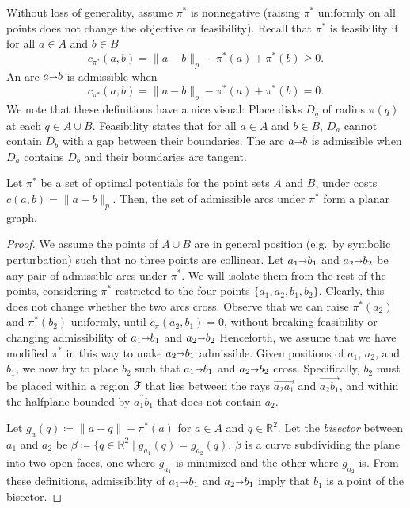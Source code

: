 \documentclass[a4paper,UKenglish]{socg-lipics-v2018}
\def\reals{\mathbb{R}}
\def\norm#1{\mathopen\| #1 \mathclose\|}	%
\def\arcto{\mathord\shortrightarrow}
\def\arc#1#2{#1\arcto#2}
\theoremstyle{plain}
\numberwithin{figure}{section}
\def\EMPH#1{\textcolor{BrickRed}{{\emph{#1}}}}
\begin{document}
\begin{toappendix}
Without loss of generality, assume $\pi^*$ is nonnegative (raising $\pi^*$
uniformly on all points does not change the objective or feasibility).
Recall that $\pi^*$ is feasibility if for all $a \in A$ and $b \in B$
\[
	c_{\pi^*}(a, b) = \norm{a-b}_p - \pi^*(a) + \pi^*(b) \geq 0.
\]
An arc $\arc ab$ is admissible when
\[
	c_{\pi^*}(a, b) = \norm{a-b}_p - \pi^*(a) + \pi^*(b) = 0.
\]
We note that these definitions have a nice visual:
Place disks $D_q$ of radius $\pi(q)$ at each $q \in A \cup B$.
Feasibility states that for all $a \in A$ and $b \in B$, $D_a$ cannot contain
$D_b$ with a gap between their boundaries.
The arc $\arc ab$ is admissible when $D_a$ contains $D_b$ and their boundaries
are tangent.

\begin{lemmarep}
\label{lemma:admiss_planar}
Let $\pi^*$ be a set of optimal potentials for the point sets $A$ and $B$,
under costs $c(a, b) = \norm{a-b}_p$.
Then, the set of admissible arcs under $\pi^*$ form a planar graph.
\end{lemmarep}

\begin{proof}
We assume the points of $A \cup B$ are in general position (e.g.\ by symbolic
perturbation) such that no three points are collinear.
Let $\arc{a_1}{b_1}$ and $\arc{a_2}{b_2}$ be any pair of admissible arcs under
$\pi^*$.
We will isolate them from the rest of the points, considering $\pi^*$
restricted to the four points $\{a_1, a_2, b_1, b_2\}$.
Clearly, this does not change whether the two arcs cross.
Observe that we can raise $\pi^*(a_2)$ and $\pi^*(b_2)$ uniformly, until
$c_\pi(a_2, b_1) = 0$, without breaking feasibility or changing admissibility
of $\arc{a_1}{b_1}$ and $\arc{a_2}{b_2}$
Henceforth, we assume that we have modified $\pi^*$ in this way to make
$\arc{a_2}{b_1}$ admissible.
Given positions of $a_1$, $a_2$, and $b_1$, we now try to place $b_2$ such that
$\arc{a_1}{b_1}$ and $\arc{a_2}{b_2}$ cross.
Specifically, $b_2$ must be placed within a region $\EuScript{F}$ that lies
between the rays $\overrightarrow{a_2 a_1}$ and $\overrightarrow{a_2 b_1}$,
and within the halfplane bounded by $\overleftrightarrow{a_1 b_1}$ that does
not contain $a_2$.

Let $g_a(q) \coloneqq \norm{a-q} - \pi^*(a)$ for $a \in A$ and
$q \in \reals^2$.
Let the \EMPH{bisector} between $a_1$ and $a_2$ be
$\beta \coloneqq \{q \in \reals^2 \mid g_{a_1}(q) = g_{a_2}(q)$.
$\beta$ is a curve subdividing the plane into two open faces, one where
$g_{a_1}$ is minimized and the other where $g_{a_2}$ is.
From these definitions, admissibility of $\arc{a_1}{b_1}$ and $\arc{a_2}{b_1}$
imply that $b_1$ is a point of the bisector.


\end{proof}
\end{toappendix}
\end{document}
